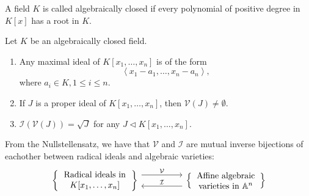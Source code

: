 \documentclass[titlepage]{article}
\theoremstyle{remark}
\newcommand{\idealof}{\vartriangleleft}
\begin{document}
  \begin{definition}
    A field $K$ is called algebraically closed if every polynomial of positive degree in $K[x]$ has a root in $K$.
  \end{definition}
  \begin{theorem}
    Let $K$ be an algebraically closed field.
    \begin{enumerate}
      \item Any maximal ideal of $K[x_1,\dots,x_n]$ is of the form \[\left\langle x_1-a_1,\dots,x_n-a_n\right\rangle,\] where $a_i\in K, 1\le i\le n$.
      \item If $J$ is a proper ideal of $K[x_1,\dots,x_n]$, then $\mathcal{V}(J)\ne\emptyset.$
      \item $\mathcal{I}(\mathcal{V}(J))=\sqrt{J}$ for any $J\idealof K[x_1,\dots,x_n].$
    \end{enumerate}
  \end{theorem}
  From the Nullstellensatz, we have that $\mathcal{V}$ and $\mathcal{I}$ are mutual inverse bijections of eachother between radical ideals and algebraic varieties:
  \[
    \begin{tikzcd}[column sep=huge]
      \left\{\parbox{3cm}{\centering Radical ideals in\\ $K[x_1,\ldots,x_n]$}\right\}
      \arrow[r, "\mathcal{V}", shift left=1.5ex]
      \arrow[r, "\mathcal{I}", leftarrow, shift right=1.5ex]
      &
      \left\{\parbox{2.8cm}{\centering Affine algebraic\\ varieties in $\mathbb{A}^n$}\right\}
    \end{tikzcd}
  \]
\end{document}

